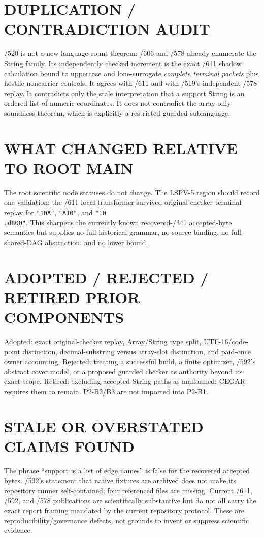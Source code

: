 \documentclass[11pt]{article}
\begin{document}
\section{DUPLICATION / CONTRADICTION AUDIT}
/520 is not a new language-count theorem: /606 and /578 already enumerate the String family.  Its independently checked increment is the exact /611 shadow calculation bound to uppercase and lone-surrogate \emph{complete terminal packets} plus hostile noncarrier controls.  It agrees with /611 and with /519's independent /578 replay.  It contradicts only the stale interpretation that a support String is an ordered list of numeric coordinates.  It does not contradict the array-only soundness theorem, which is explicitly a restricted guarded sublanguage.

\section{WHAT CHANGED RELATIVE TO ROOT MAIN}
The root scientific node statuses do not change.  The LSPV-5 region should record one validation: the /611 local transformer survived original-checker terminal replay for \texttt{"10A"}, \texttt{"A10"}, and \texttt{"10\\ud800"}.  This sharpens the currently known recovered-/341 accepted-byte semantics but supplies no full historical grammar, no source binding, no full shared-DAG abstraction, and no lower bound.

\section{ADOPTED / REJECTED / RETIRED PRIOR COMPONENTS}
Adopted: exact original-checker replay, Array/String type split, UTF-16/code-point distinction, decimal-substring versus array-slot distinction, and paid-once owner accounting.  Rejected: treating a successful build, a finite optimizer, /592's abstract cover model, or a proposed guarded checker as authority beyond its exact scope.  Retired: excluding accepted String paths as malformed; CEGAR requires them to remain.  P2-B2/B3 are not imported into P2-B1.

\section{STALE OR OVERSTATED CLAIMS FOUND}
The phrase ``support is a list of edge names'' is false for the recovered accepted bytes.  /592's statement that native fixtures are archived does not make its repository runner self-contained; four referenced files are missing.  Current /611, /592, and /578 publications are scientifically substantive but do not all carry the exact report framing mandated by the current repository protocol.  These are reproducibility/governance defects, not grounds to invent or suppress scientific evidence.
\end{document}
